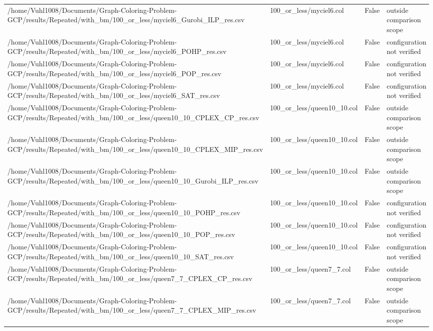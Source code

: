 \begin{table}[htbp]
\begin{tabular}{llll}
/home/Vuhl1008/Documents/Graph-Coloring-Problem-GCP/results/Repeated/with\_bm/100\_or\_less/myciel6\_Gurobi\_ILP\_res.csv & 100\_or\_less/myciel6.col & False & outside comparison scope \\
/home/Vuhl1008/Documents/Graph-Coloring-Problem-GCP/results/Repeated/with\_bm/100\_or\_less/myciel6\_POHP\_res.csv & 100\_or\_less/myciel6.col & False & configuration not verified \\
/home/Vuhl1008/Documents/Graph-Coloring-Problem-GCP/results/Repeated/with\_bm/100\_or\_less/myciel6\_POP\_res.csv & 100\_or\_less/myciel6.col & False & configuration not verified \\
/home/Vuhl1008/Documents/Graph-Coloring-Problem-GCP/results/Repeated/with\_bm/100\_or\_less/myciel6\_SAT\_res.csv & 100\_or\_less/myciel6.col & False & configuration not verified \\
/home/Vuhl1008/Documents/Graph-Coloring-Problem-GCP/results/Repeated/with\_bm/100\_or\_less/queen10\_10\_CPLEX\_CP\_res.csv & 100\_or\_less/queen10\_10.col & False & outside comparison scope \\
/home/Vuhl1008/Documents/Graph-Coloring-Problem-GCP/results/Repeated/with\_bm/100\_or\_less/queen10\_10\_CPLEX\_MIP\_res.csv & 100\_or\_less/queen10\_10.col & False & outside comparison scope \\
/home/Vuhl1008/Documents/Graph-Coloring-Problem-GCP/results/Repeated/with\_bm/100\_or\_less/queen10\_10\_Gurobi\_ILP\_res.csv & 100\_or\_less/queen10\_10.col & False & outside comparison scope \\
/home/Vuhl1008/Documents/Graph-Coloring-Problem-GCP/results/Repeated/with\_bm/100\_or\_less/queen10\_10\_POHP\_res.csv & 100\_or\_less/queen10\_10.col & False & configuration not verified \\
/home/Vuhl1008/Documents/Graph-Coloring-Problem-GCP/results/Repeated/with\_bm/100\_or\_less/queen10\_10\_POP\_res.csv & 100\_or\_less/queen10\_10.col & False & configuration not verified \\
/home/Vuhl1008/Documents/Graph-Coloring-Problem-GCP/results/Repeated/with\_bm/100\_or\_less/queen10\_10\_SAT\_res.csv & 100\_or\_less/queen10\_10.col & False & configuration not verified \\
/home/Vuhl1008/Documents/Graph-Coloring-Problem-GCP/results/Repeated/with\_bm/100\_or\_less/queen7\_7\_CPLEX\_CP\_res.csv & 100\_or\_less/queen7\_7.col & False & outside comparison scope \\
/home/Vuhl1008/Documents/Graph-Coloring-Problem-GCP/results/Repeated/with\_bm/100\_or\_less/queen7\_7\_CPLEX\_MIP\_res.csv & 100\_or\_less/queen7\_7.col & False & outside comparison scope \\

\end{tabular}
\end{table}
